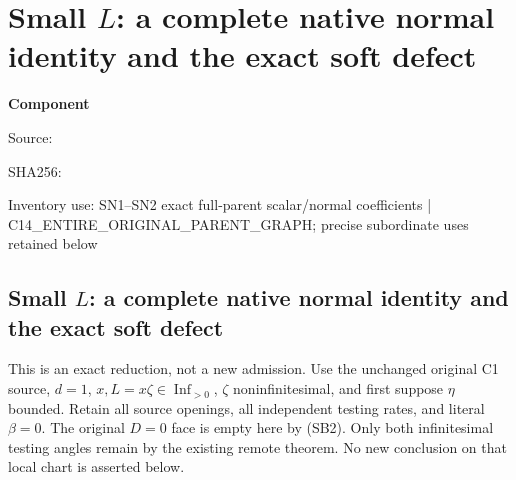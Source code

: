 \chapter{Small $L$: a complete native normal identity and the exact soft defect}
\label{component:pc15b7caff0a3}
\noindent\textbf{Component }\par
{\small\noindent Source: \par}
{\small\noindent SHA256: \par}
{\small\noindent Inventory use: SN1--SN2 exact full-parent scalar/normal coefficients | C14\_\allowbreak{}ENTIRE\_\allowbreak{}ORIGINAL\_\allowbreak{}PARENT\_\allowbreak{}GRAPH; precise subordinate uses retained below\par}
\medskip
\section{Small $L$: a complete native normal identity and the exact soft defect}
\label{pc15b7caff0a3:sec:r8-small-L-native-normal}

This is an exact reduction, not a new admission. Use the unchanged
original C1 source, $d=1$, $x,L=x\zeta\in\operatorname{Inf}_{>0}$,
$\zeta$ noninfinitesimal, and first suppose $\eta$ bounded. Retain
all source openings, all independent testing rates, and literal
$\beta=0$. The original $D=0$ face is empty here by (SB2).
Only both infinitesimal testing angles remain by the existing remote
theorem. No new conclusion on that local chart is asserted below.

